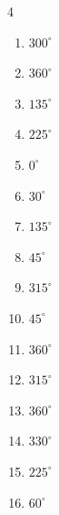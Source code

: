 \begin{multicols}{4}
\begin{enumerate}
  \item $\displaystyle 300^{\circ}$

  \item $\displaystyle 360^{\circ}$
        \phantom{$\displaystyle =2\pi$}

  \item $\displaystyle 135^{\circ}$

  \item $\displaystyle 225^{\circ}$

  \item $\displaystyle 0^{\circ}$
        \phantom{$\displaystyle =0$}

  \item $\displaystyle 30^{\circ}$

  \item $\displaystyle 135^{\circ}$

  \item $\displaystyle 45^{\circ}$

  \item $\displaystyle 315^{\circ}$

  \item $\displaystyle 45^{\circ}$

  \item $\displaystyle 360^{\circ}$
        \phantom{$\displaystyle =2\pi$}

  \item $\displaystyle 315^{\circ}$

  \item $\displaystyle 360^{\circ}$
        \phantom{$\displaystyle =2\pi$}

  \item $\displaystyle 330^{\circ}$

  \item $\displaystyle 225^{\circ}$

  \item $\displaystyle 60^{\circ}$


\end{enumerate}
\end{multicols}
